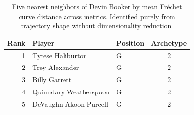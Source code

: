 \begin{table}[htbp]
  \centering\small
  \begin{tabular}{rllc}
    \toprule
    Rank & Player & Position & Archetype \\
    \midrule
    1 & Tyrese Haliburton & G & 2 \\
    2 & Trey Alexander & G & 2 \\
    3 & Billy Garrett & G & 2 \\
    4 & Quinndary Weatherspoon & G & 2 \\
    5 & DeVaughn Akoon-Purcell & G & 2 \\
    \bottomrule
  \end{tabular}
  \caption{Five nearest neighbors of Devin Booker by mean Fr\'{e}chet curve distance across metrics. Identified purely from trajectory shape without dimensionality reduction.}
  \label{tab:Devin_Booker_frechet_curve_neighbors}
\end{table}

